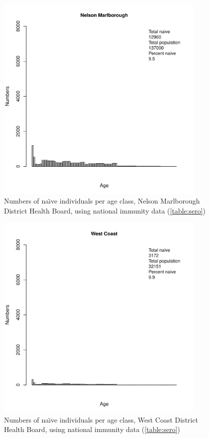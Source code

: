 \documentclass{article}
\begin{document}
\begin{figure}[H]
     \begin{center}
     \includegraphics[width=0.9\textwidth]{dhb16.pdf}
     \end{center}
     \caption{Numbers of na\"{\i}ve individuals per age class, Nelson Marlborough District Health Board, using national immunity data (\autoref{table:sero})}
     \label{fig:NelsonMarlborough}
\end{figure}

\begin{figure}[H]
     \begin{center}
     \includegraphics[width=0.9\textwidth]{dhb17.pdf}
     \end{center}
     \caption{Numbers of na\"{\i}ve individuals per age class, West Coast District Health Board, using national immunity data (\autoref{table:sero})}
     \label{fig:WestCoast}
\end{figure}
\end{document}
